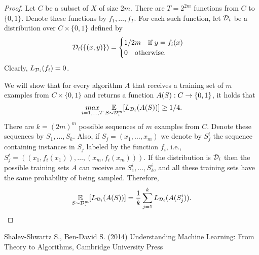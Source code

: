 \documentclass[11pt,a4paper]{article}
\begin{document}
\begin{proof}
Let $C$ be a subset of $X$ of size $2m$. There are $T = 2^{2m}$ functions from $C$ to $\{0,1\}$. Denote these functions by $f_1,\ldots,f_T$. For each such function, let $\mathcal{D}_i$ be a distribution over $C\times \{0,1\}$ defined by 
\begin{equation*}
    \mathcal{D}_i(\{(x,y)\}) = \begin{cases}
    1/2m\quad\text{if }y = f_i(x)\\
    0\quad\text{otherwise}.
    \end{cases}
\end{equation*}
Clearly, $L_{\mathcal{D}_i}(f_i) = 0$.

We will show that for every algorithm $A$ that receives a training set of $m$ examples from $C\times \{0,1\}$ and returns a function $A(S):C\rightarrow \{0,1\}$, it holds that 
\begin{equation*}
    \underset{i = 1,\ldots,T}{max}\; \underset{S\sim \mathcal{D}_i^m}{\mathbb{E}}[L_{\mathcal{D}_i}(A(S))] \ge 1/4.
\end{equation*}
There are $k = (2m)^m$ possible sequences of $m$ examples from $C$. Denote these sequences by $S_1,\ldots,S_k$. Also, if $S_j = (x_1,\ldots,x_m)$ we denote by $S_j^i$ the sequence containing instances in $S_j$ labeled by the function $f_i$, i.e., $S_j^i= ((x_1,f_i(x_1)),\ldots,(x_m,f_i(x_m)))$. If the distribution is $\mathcal{D}_i$ then the possible training sets $A$ can receive are $S_1^i,\ldots,S^i_k$, and all these training sets have the same probability of being sampled. Therefore,
\begin{equation*}
    \underset{S\sim\mathcal{D}_i^m}{\mathbb{E}}[L_{\mathcal{D}_i}(A(S))] = \frac{1}{k}\sum_{j=1}^k L_{\mathcal{D}_i}(A(S_j^i)).
\end{equation*}
\end{proof}


\begin{thebibliography}{9}
Shalev-Shwartz S., Ben-David S. (2014) Understanding Machine Learning: From Theory to Algorithms, Cambridge University Press


\end{thebibliography}
\end{document}

